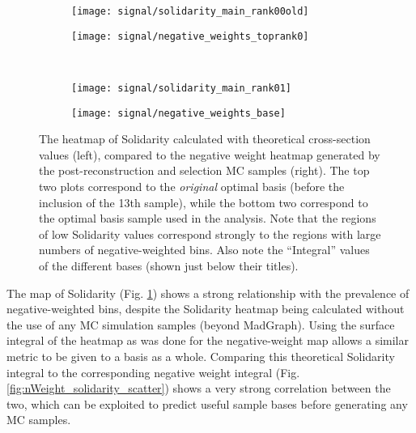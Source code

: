     \begin{figure}[tbh]
    	\centering
        \begin{subfigure}{0.48\textwidth}
            \texttt{[image: signal/solidarity\_main\_rank00old]}
            \captionsetup{justification=centering} \caption{}
        \end{subfigure}
        \begin{subfigure}{0.48\textwidth}
            \texttt{[image: signal/negative\_weights\_toprank0]}
            \captionsetup{justification=centering} \caption{}
        \end{subfigure}
        \\
        \begin{subfigure}{0.48\textwidth}
            \texttt{[image: signal/solidarity\_main\_rank01]}
            \captionsetup{justification=centering} \caption{}
        \end{subfigure}
        \begin{subfigure}{0.5\textwidth}
            \texttt{[image: signal/negative\_weights\_base]}
            \captionsetup{justification=centering} \caption{}
        \end{subfigure}
        \caption{
            The heatmap of Solidarity calculated with theoretical cross-section values (left),
                compared to the negative weight heatmap generated by the post-reconstruction and selection MC samples (right).
            The top two plots correspond to the \textit{original} optimal basis (before the inclusion of the 13th sample),
                while the bottom two correspond to the optimal basis sample used in the analysis.
            Note that the regions of low Solidarity values correspond strongly to the regions with large numbers of negative-weighted bins.
            Also note the ``Integral'' values of the different bases (shown just below their titles).
        }
        \label{fig:solidarity_heatmaps}
    \end{figure}

    The map of Solidarity (Fig. \ref{fig:solidarity_heatmaps}) shows a strong relationship with the prevalence of negative-weighted bins,
        despite the Solidarity heatmap being calculated without the use of any MC simulation samples (beyond MadGraph).
    Using the surface integral of the heatmap as was done for the negative-weight map allows a similar metric to be given to a basis as a whole.
    Comparing this theoretical Solidarity integral to the corresponding negative weight integral (Fig. \ref{fig:nWeight_solidarity_scatter})
        shows a very strong correlation between the two,
        which can be exploited to predict useful sample bases before generating any MC samples.

